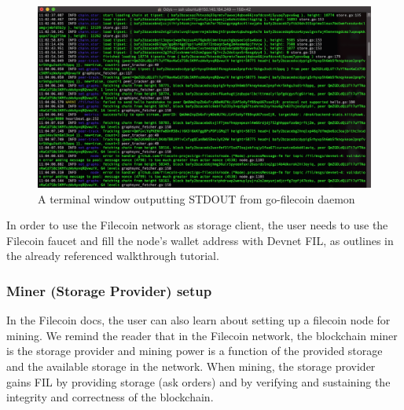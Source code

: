 \begin{figure}[h]
    \centering
    \includegraphics[width=1\textwidth]{images/filecoin_terminal.png}
    \caption{A terminal window outputting STDOUT from go-filecoin daemon}
    \label{fig:filecoin_terminal}
\end{figure}

In order to use the Filecoin network as storage client, the user needs to use the Filecoin faucet and fill the node’s wallet address with Devnet FIL, as outlines in the already referenced walkthrough tutorial.

\subsubsection{Miner (Storage Provider) setup}

In the Filecoin docs, the user can also learn about setting up a filecoin node for mining. We remind the reader that in the Filecoin network, the blockchain miner is the storage provider and mining power is a function of the provided storage and the available storage in the network. When mining, the storage provider gains FIL by providing storage (ask orders) and by verifying and sustaining the integrity and correctness of the blockchain.


